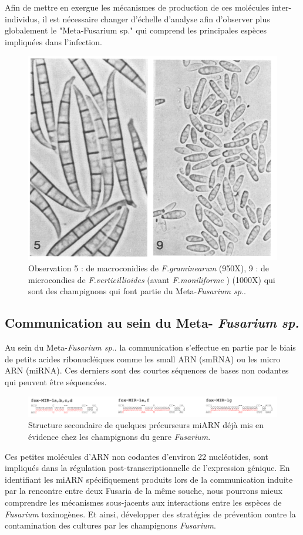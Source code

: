\documentclass{report}
\begin{document}
Afin de mettre en exergue les mécanismes de production de ces molécules inter-individus, il est nécessaire changer d'échelle d'analyse afin d’observer plus globalement le "Meta-Fusarium sp." qui comprend les principales espèces impliquées dans l’infection.\cite{ponts2009fusarium, mycsa} \\

\begin{figure}
    \centering
    \includegraphics[width=.40\textwidth]{Images/fig_2.png}
    \caption{Observation 5 : de macroconidies de \textit{F.graminearum} (950X), 9 : de microcondies de \textit{F.verticillioides} (avant \textit{F.moniliforme} \cite{name}) (1000X) qui sont des champignons qui font partie du Meta-\textit{Fusarium sp.}.  \cite{taxonomy}}
    \label{fig:fusa}
\end{figure}

\subsection{Communication au sein du Meta-
\textit{Fusarium sp.}}
Au sein du Meta-\textit{Fusarium sp.}. la communication s’effectue en partie par le biais de petits acides ribonucléiques comme les small ARN (smRNA) ou les micro ARN (miRNA). Ces derniers sont des courtes séquences de bases non codantes qui peuvent être séquencées.\\

\begin{figure}[h]
    \centering
    \includegraphics[width=1\textwidth]{Images/fig_3.png}
    \caption{Structure secondaire de quelques précurseurs miARN déjà mis en évidence chez les champignons du genre \textit{Fusarium}.\cite{chen2014exploring}}
    \label{fig:mirna}
\end{figure}

Ces petites molécules d'ARN non codantes d'environ 22 nucléotides, sont impliqués dans la régulation post-transcriptionnelle de l'expression génique. En identifiant les miARN spécifiquement produits lors de la communication induite par la rencontre entre deux Fusaria de la même souche, nous pourrons mieux comprendre les mécanismes sous-jacents aux interactions entre les espèces de \textit{Fusarium} toxinogènes. Et ainsi, développer des stratégies de prévention contre la contamination des cultures par les champignons \textit{Fusarium}. \cite{ponts2009fusarium, mycsa} \\
\end{document}
